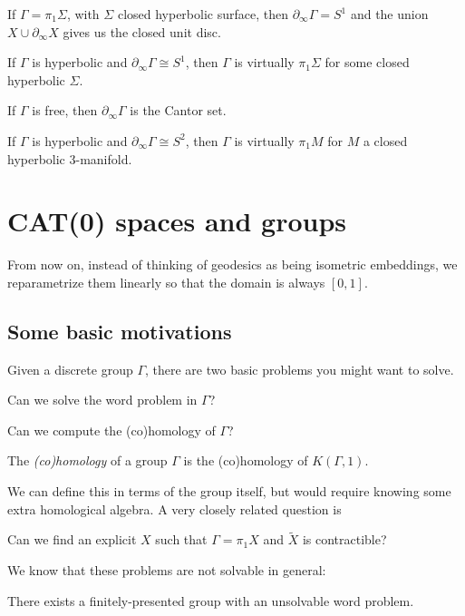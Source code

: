 \documentclass[a4paper]{article}
\begin{document}
\begin{eg}
  If $\Gamma = \pi_1 \Sigma$, with $\Sigma$ closed hyperbolic surface, then $\partial_\infty \Gamma = S^1$ and the union $X \cup \partial_\infty X$ gives us the closed unit disc.
\end{eg}

\begin{thm}
  If $\Gamma$ is hyperbolic and $\partial_\infty \Gamma \cong S^1$, then $\Gamma$ is virtually $\pi_1 \Sigma$ for some closed hyperbolic $\Sigma$.
\end{thm}

\begin{eg}
  If $\Gamma$ is free, then $\partial_\infty \Gamma$ is the Cantor set.
\end{eg}

\begin{conjecture}[Cannon]
  If $\Gamma$ is hyperbolic and $\partial_\infty \Gamma \cong S^2$, then $\Gamma$ is virtually $\pi_1 M$ for $M$ a closed hyperbolic $3$-manifold.
\end{conjecture}

\section{CAT(0) spaces and groups}
From now on, instead of thinking of geodesics as being isometric embeddings, we reparametrize them linearly so that the domain is always $[0, 1]$.

\subsection{Some basic motivations}
Given a discrete group $\Gamma$, there are two basic problems you might want to solve.
\begin{question}
  Can we solve the word problem in $\Gamma$?
\end{question}

\begin{question}
  Can we compute the (co)homology of $\Gamma$?
\end{question}

\begin{defi}
  The \emph{(co)homology} of a group $\Gamma$ is the (co)homology of $K(\Gamma, 1)$.
\end{defi}
We can define this in terms of the group itself, but would require knowing some extra homological algebra. A very closely related question is
\begin{question}
  Can we find an explicit $X$ such that $\Gamma = \pi_1 X$ and $\tilde{X}$ is contractible?
\end{question}
We know that these problems are not solvable in general:
\begin{thm}
  There exists a finitely-presented group with an unsolvable word problem.
\end{thm}
\end{document}
